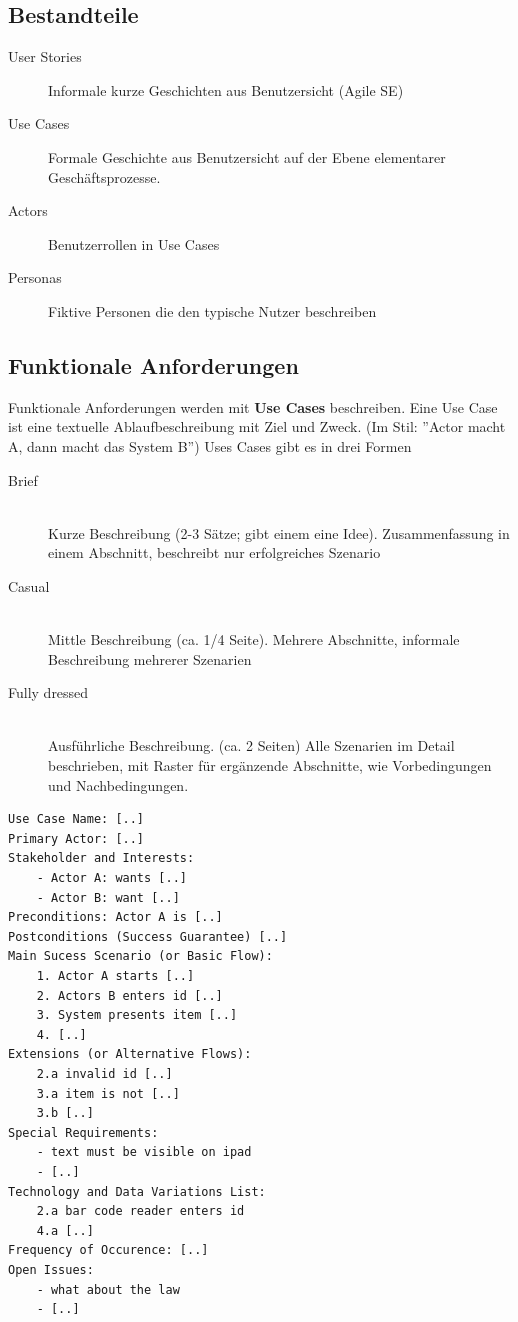 \subsection{Bestandteile}
\begin{description}
	\item[User Stories] Informale kurze Geschichten aus Benutzersicht (Agile SE)
	\item[Use Cases] Formale Geschichte aus Benutzersicht auf der Ebene elementarer Geschäftsprozesse. 
	\item[Actors] Benutzerrollen in Use Cases
	\item[Personas] Fiktive Personen die den typische Nutzer beschreiben
\end{description}

\subsection{Funktionale Anforderungen}
Funktionale Anforderungen werden mit \textbf{Use Cases} beschreiben. Eine Use Case ist eine textuelle Ablaufbeschreibung mit Ziel und Zweck. (Im Stil: ''Actor macht A, dann macht das System B'') Uses Cases gibt es in drei Formen
\begin{description}
	\item[Brief] \hfill \\
	Kurze Beschreibung (2-3 Sätze; gibt einem eine Idee). Zusammenfassung in einem Abschnitt, beschreibt nur erfolgreiches Szenario
	\item[Casual] \hfill \\
	Mittle Beschreibung (ca. 1/4 Seite). Mehrere Abschnitte, informale Beschreibung mehrerer Szenarien
	\item[Fully dressed] \hfill \\
	Ausführliche Beschreibung. (ca. 2 Seiten) Alle Szenarien im Detail beschrieben, mit Raster für ergänzende Abschnitte, wie Vorbedingungen und Nachbedingungen.
\end{description}


\begin{lstlisting}[caption=Fully Dressed Use Case Beispiel]
Use Case Name: [..]
Primary Actor: [..]
Stakeholder and Interests: 
	- Actor A: wants [..]
	- Actor B: want [..]
Preconditions: Actor A is [..]
Postconditions (Success Guarantee) [..]
Main Sucess Scenario (or Basic Flow):
	1. Actor A starts [..]
	2. Actors B enters id [..]
	3. System presents item [..]
	4. [..]
Extensions (or Alternative Flows):
	2.a invalid id [..]
	3.a item is not [..]
	3.b [..]
Special Requirements:
	- text must be visible on ipad 
	- [..]
Technology and Data Variations List:
	2.a bar code reader enters id 
	4.a [..]
Frequency of Occurence: [..]
Open Issues: 
	- what about the law 
	- [..]
\end{lstlisting}

